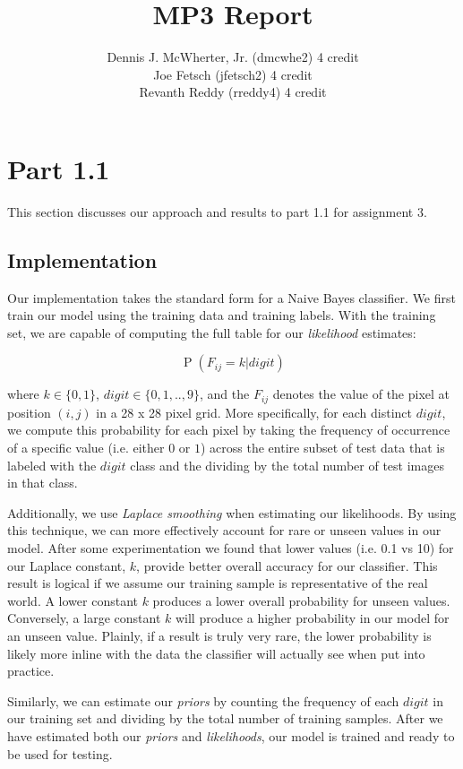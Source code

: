 \documentclass[10pt,a4paper]{article}
\title{MP3 Report}
\author{Dennis J. McWherter, Jr. (dmcwhe2) 4 credit \\
		Joe Fetsch (jfetsch2) 4 credit \\
		Revanth Reddy (rreddy4) 4 credit}
\begin{document}
\maketitle

\section{Part 1.1}
This section discusses our approach and results to part 1.1 for assignment 3.

\subsection{Implementation}

Our implementation takes the standard form for a Naive Bayes classifier. We first train our model using the training data and training labels. With the training set, we are capable of computing the full table for our \emph{likelihood} estimates:

\begin{equation}
\operatorname{P}(F_{ij} = k | digit)
\end{equation}

where $k \in \{0, 1\}$, $digit \in \{0,1,..,9\}$, and the $F_{ij}$ denotes the value of the pixel at position $(i, j)$ in a 28 x 28 pixel grid. More specifically, for each distinct $digit$, we compute this probability for each pixel by taking the frequency of occurrence of a specific value (i.e. either $0$ or $1$) across the entire subset of test data that is labeled with the $digit$ class and the dividing by the total number of test images in that class.

Additionally, we use \emph{Laplace smoothing} when estimating our likelihoods. By using this technique, we can more effectively account for rare or unseen values in our model. After some experimentation we found that lower values (i.e. 0.1 vs 10) for our Laplace constant, $k$, provide better overall accuracy for our classifier. This result is logical if we assume our training sample is representative of the real world. A lower constant $k$ produces a lower overall probability for unseen values. Conversely, a large constant $k$ will produce a higher probability in our model for an unseen value. Plainly, if a result is truly very rare, the lower probability is likely more inline with the data the classifier will actually see when put into practice.

Similarly, we can estimate our \emph{priors} by counting the frequency of each $digit$ in our training set and dividing by the total number of training samples. After we have estimated both our \emph{priors} and \emph{likelihoods}, our model is trained and ready to be used for testing.
\end{document}
